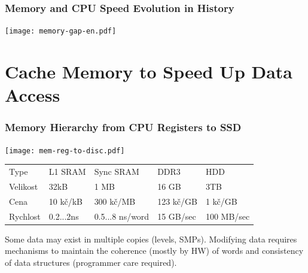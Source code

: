 \documentclass{beamer}
\begin{document}
\begin{frame}
\frametitle{Memory and CPU Speed Evolution in History}

\centering

\texttt{[image: memory-gap-en.pdf]}

\end{frame}

\section{Cache Memory to Speed Up Data Access}

\begin{frame}
\frametitle{Memory Hierarchy from CPU Registers to SSD}

{
\centering

\texttt{[image: mem-reg-to-disc.pdf]}

}
\vskip 2mm

\begin{tabular}{l|llll}
Type     & L1 SRAM   & Sync SRAM &  DDR3      & HDD \\
Velikost & 32kB      & 1 MB      &  16 GB     & 3TB \\
Cena     & 10 kč/kB  & 300 kč/MB &  123 kč/GB & 1 kč/GB \\
Rychlost & 0.2...2ns & 0.5...8 ns/word & 15 GB/sec & 100 MB/sec \\
\end{tabular}

\vskip 2mm

Some data may exist in multiple copies (levels, SMPs).
Modifying data requires mechanisms to maintain the coherence (mostly by HW) of words and consistency of data structures (programmer care required).

\end{frame}
\end{document}

